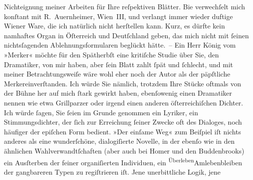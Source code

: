                Nichteignung meiner Arbeiten für Ihre reſpektiven Blätter. Bie verwechſelt mich konſtant mit R. Auernheimer, Wien III,
               und verlangt immer wieder duftige Wiener Ware, die
               ich natürlich nicht herſtellen kann. Kurz, es dürfte kein namhaftes Organ in Öſterreich und Deutſchland geben, das mich nicht mit ſeinen nichtsſagenden
               Ablehnungsformularen beglückt hätte. – Ein Herr König vom »Merker« möchte für den
               Spätherbſt eine kritiſche Studie über Sie, den Dramatiker, von mir haben, aber ſein
               Blatt zahlt ſpät und ſchlecht, und mit meiner Betrachtungsweiſe wäre wohl eher noch
               der Autor als der päpſtliche Merkereinverſtanden. Ich würde Sie nämlich,
               trotzdem Ihre Stücke oftmals von der Bühne her auf mich ſtark gewirkt haben,
               ebenſowenig einen Dramatiker nennen wie etwa Grillparzer oder irgend einen anderen öſterreichiſchen Dichter. Ich würde ſagen, Sie ſeien im Grunde genommen ein
               Lyriker, ein Stimmungsdichter, der ſich zu\introOben{}r\introOben{}{ } Erreichung ſeiner Zwecke oft des Dialoges,
               noch häufiger der epiſchen Form bedient. »Der einſame
                  Weg« zum Beiſpiel iſt nichts \introOben{}anderes\introOben{} als eine
               wunderſchöne, dialogiſierte Novelle, in der ebenſo wie in den ähnlichen Wahlverwandtſchaften (aber auch bei Homer und den Buddenbrooks) ein Ausſterben der feiner organiſierten Individuen, ein \substVorne{}\textsuperscript{Überleben}\substDazwischen{}Amlebenbleiben\substHinten{} der gangbareren Typen zu regiſtrieren iſt. Jene unerbittliche Logik, jene
